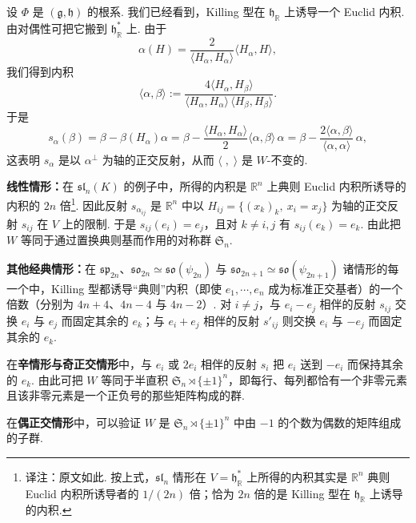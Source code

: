 \begin{example*}
设 $\Phi$ 是 $(\mathfrak g,\mathfrak h)$ 的根系. 我们已经看到，Killing 型在 $\mathfrak h_{\mathbb R}$ 上诱导一个 Euclid 内积. 由对偶性可把它搬到 $\mathfrak h^{*}_{\mathbb R}$ 上. 由于
\[\alpha(H)=\frac{2}{\langle H_{\alpha},H_{\alpha}\rangle}\langle H_{\alpha},H\rangle,\]
我们得到内积
\[\langle\alpha,\beta\rangle:=\frac{4\langle H_{\alpha},H_{\beta}\rangle}{\langle H_{\alpha},H_{\alpha}\rangle\,\langle H_{\beta},H_{\beta}\rangle}.\]
于是
\[s_{\alpha}(\beta)=\beta-\beta(H_{\alpha})\alpha=\beta-\frac{\langle H_{\alpha},H_{\alpha}\rangle}{2}\langle\alpha,\beta\rangle\,\alpha=\beta-\frac{2\langle\alpha,\beta\rangle}{\langle\alpha,\alpha\rangle}\,\alpha,\]
这表明 $s_{\alpha}$ 是以 $\alpha^{\perp}$ 为轴的正交反射，从而 $\langle\;,\;\rangle$ 是 $W$-不变的.

\textbf{线性情形：}在 $\mathfrak{sl}_n(K)$ 的例子中，所得的内积是 $\mathbb{R}^n$ 上典则 Euclid 内积所诱导的内积的 $2n$ 倍\footnote{译注：原文如此. 按上式，$\mathfrak{sl}_n$ 情形在 $V=\mathfrak h^{*}_{\mathbb R}$ 上所得的内积其实是 $\mathbb R^n$ 典则 Euclid 内积所诱导者的 $1/(2n)$ 倍；恰为 $2n$ 倍的是 Killing 型在 $\mathfrak h_{\mathbb R}$ 上诱导的内积.}. 因此反射 $s_{\alpha_{ij}}$ 是 $\mathbb{R}^n$ 中以 $H_{ij}=\{(x_k)_k,\ x_i=x_j\}$ 为轴的正交反射 $s_{ij}$ 在 $V$ 上的限制. 于是 $s_{ij}(e_i)=e_j$，且对 $k\neq i,j$ 有 $s_{ij}(e_k)=e_k$. 由此把 $W$ 等同于通过置换典则基而作用的对称群 $\mathfrak{S}_n$.

\textbf{其他经典情形：}在 $\mathfrak{sp}_{2n}$、$\mathfrak{so}_{2n}\simeq\mathfrak{so}(\psi_{2n})$ 与 $\mathfrak{so}_{2n+1}\simeq\mathfrak{so}(\psi_{2n+1})$ 诸情形的每一个中，Killing 型都诱导``典则''内积（即使 $e_1,\cdots,e_n$ 成为标准正交基者）的一个倍数（分别为 $4n+4$、$4n-4$ 与 $4n-2$）. 对 $i\neq j$，与 $e_i-e_j$ 相伴的反射 $s_{ij}$ 交换 $e_i$ 与 $e_j$ 而固定其余的 $e_k$；与 $e_i+e_j$ 相伴的反射 $s'_{ij}$ 则交换 $e_i$ 与 $-e_j$ 而固定其余的 $e_k$.

在\textbf{辛情形与奇正交情形}中，与 $e_i$ 或 $2e_i$ 相伴的反射 $s_i$ 把 $e_i$ 送到 $-e_i$ 而保持其余的 $e_k$. 由此可把 $W$ 等同于半直积 $\mathfrak{S}_n\rtimes\{\pm1\}^n$，即每行、每列都恰有一个非零元素且该非零元素是一个正负号的那些矩阵构成的群.

在\textbf{偶正交情形}中，可以验证 $W$ 是 $\mathfrak{S}_n\rtimes\{\pm1\}^n$ 中由 $-1$ 的个数为偶数的矩阵组成的子群.
\end{example*}
